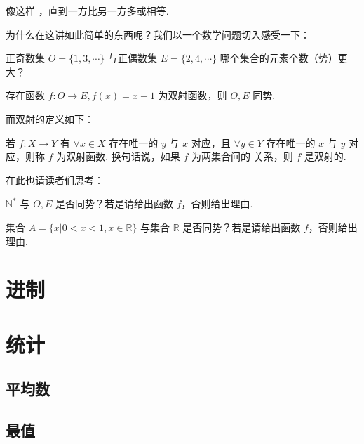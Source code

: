 像这样 ，直到一方比另一方多或相等.

为什么在这讲如此简单的东西呢？我们以一个数学问题切入感受一下：

\begin{question}
  正奇数集 $O = \{1, 3, \cdots\}$ 与正偶数集 $E = \{2, 4, \cdots\}$ 哪个集合的元素个数（势）更大？
\end{question}

\begin{solution}
  存在函数 $f: O \to E, f(x) = x + 1$ 为双射函数，则 $O, E$ 同势.
\end{solution}

而双射的定义如下：

\begin{definition}[双射函数]
  若 $f: X \to Y$ 有 $\forall x \in X$ 存在唯一的 $y$ 与 $x$ 对应，且 $\forall y \in Y$ 存在唯一的 $x$ 与 $y$ 对应，则称 $f$ 为双射函数. 换句话说，如果 $f$ 为两集合间的  关系，则 $f$ 是双射的.
\end{definition}

在此也请读者们思考：

\begin{problem} \label{prob:odd-even-union}
$\mathbb{N}^*$ 与 $O, E$ 是否同势？若是请给出函数 $f$，否则给出理由.
\end{problem}

\begin{problem} \label{prob:real-number-interval}
集合 $A = \{x | 0 < x < 1, x \in \mathbb{R}\}$ 与集合 $\mathbb{R}$ 是否同势？若是请给出函数 $f$，否则给出理由.
\end{problem}

\section{进制} \label{sec:base}

\section{统计} \label{sec:statistics}

\subsection{平均数} \label{subsec:mean}

\subsection{最值} \label{subsec:max-min}

